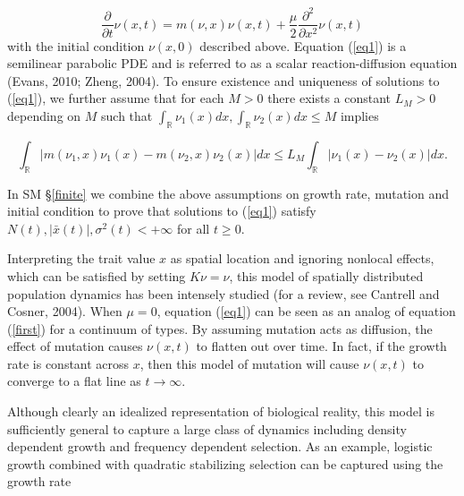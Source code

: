 \documentclass[]{elsarticle} %
\begin{document}
\begin{equation}\label{eq1}
\frac{\partial}{\partial t}\nu(x,t)=m(\nu,x)\nu(x,t)+\frac{\mu}{2}\frac{\partial^2}{\partial x^2}\nu(x,t)
\end{equation} with the initial condition \(\nu(x,0)\) described above.
Equation (\ref{eq1}) is a semilinear parabolic PDE and is referred to as
a scalar reaction-diffusion equation (Evans, 2010; Zheng, 2004). To
ensure existence and uniqueness of solutions to (\ref{eq1}), we further
assume that for each \(M>0\) there exists a constant \(L_M>0\) depending
on \(M\) such that
\(\int_\mathbb{R}\nu_1(x)dx,\int_\mathbb{R}\nu_2(x)dx\leq M\) implies

\begin{equation}\label{local_lipschitz}
\int_\mathbb{R}\left|m(\nu_1,x)\nu_1(x)-m(\nu_2,x)\nu_2(x)\right|dx\leq L_M\int_\mathbb{R}|\nu_1(x)-\nu_2(x)|dx.
\end{equation}

In SM \S\ref{finite} we combine the above assumptions on growth rate,
mutation and initial condition to prove that solutions to (\ref{eq1})
satisfy \(N(t),|\bar x(t)|,\sigma^2(t)<+\infty\) for all \(t\geq0\).

Interpreting the trait value \(x\) as spatial location and ignoring
nonlocal effects, which can be satisfied by setting \(K\nu=\nu\), this
model of spatially distributed population dynamics has been intensely
studied (for a review, see Cantrell and Cosner, 2004). When \(\mu=0\),
equation (\ref{eq1}) can be seen as an analog of equation (\ref{first})
for a continuum of types. By assuming mutation acts as diffusion, the
effect of mutation causes \(\nu(x,t)\) to flatten out over time. In
fact, if the growth rate is constant across \(x\), then this model of
mutation will cause \(\nu(x,t)\) to converge to a flat line as
\(t\to\infty\).

Although clearly an idealized representation of biological reality, this
model is sufficiently general to capture a large class of dynamics
including density dependent growth and frequency dependent selection. As
an example, logistic growth combined with quadratic stabilizing
selection can be captured using the growth rate
\end{document}
